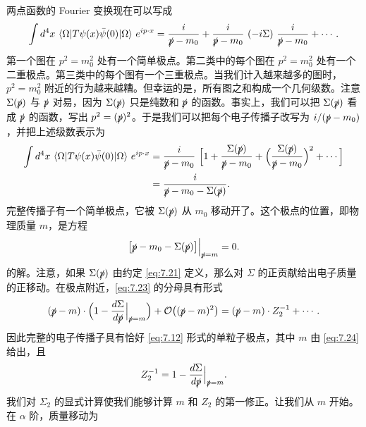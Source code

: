 两点函数的 Fourier 变换现在可以写成
\begin{equation}
  \int d^4x\ \langle\Omega|T\psi(x)\bar{\psi}(0)|\Omega\rangle\ e^{ip\cdot x}
  = \frac{i}{\slashed{p}-m_0}
    + \frac{i}{\slashed{p}-m_0}\ (-i\Sigma)\ \frac{i}{\slashed{p}-m_0}
    + \cdots .
  \label{eq:7.22}
\end{equation}
第一个图在 $p^2 = m_0^2$ 处有一个简单极点。第二类中的每个图在 $p^2 = m_0^2$ 处有一个二重极点。第三类中的每个图有一个三重极点。当我们计入越来越多的图时，$p^2 = m_0^2$ 附近的行为越来越糟。但幸运的是，所有图之和构成一个几何级数。注意 $\Sigma(\slashed{p})$ 与 $\slashed{p}$ 对易，因为 $\Sigma(\slashed{p})$ 只是纯数和 $\slashed{p}$ 的函数。事实上，我们可以把 $\Sigma(\slashed{p})$ 看成 $\slashed{p}$ 的函数，写出 $p^2 = (\slashed{p})^2$。于是我们可以把每个电子传播子改写为 $i/(\slashed{p}-m_0)$，并把上述级数表示为
\begin{equation}
  \begin{aligned}
    \int d^4x\ \langle\Omega|T\psi(x)\bar{\psi}(0)|\Omega\rangle\ e^{ip\cdot x}
    &= \frac{i}{\slashed{p}-m_0}\ \Bigl[ 1 +
      \frac{\Sigma(\slashed{p})}{\slashed{p}-m_0}
      + \Bigl( \frac{\Sigma(\slashed{p})}{\slashed{p}-m_0} \Bigr)^2
      + \cdots \Bigr]\\
    &= \frac{i}{\slashed{p}-m_0-\Sigma(\slashed{p})} .
  \end{aligned}
  \label{eq:7.23}
\end{equation}
完整传播子有一个简单极点，它被 $\Sigma(\slashed{p})$ 从 $m_0$ 移动开了。这个极点的位置，即物理质量 $m$，是方程
\begin{equation}
  \bigl[ \slashed{p} - m_0 - \Sigma(\slashed{p}) \bigr]
    \Big|_{\slashed{p}=m} = 0 .
  \label{eq:7.24}
\end{equation}
的解。注意，如果 $\Sigma(\slashed{p})$ 由约定 \eqref{eq:7.21} 定义，那么对 $\Sigma$ 的正贡献给出电子质量的正移动。在极点附近，\eqref{eq:7.23} 的分母具有形式
\begin{equation}
  (\slashed{p}-m)\cdot \Bigl( 1 - \frac{d\Sigma}{d\slashed{p}}
    \Big|_{\slashed{p}=m} \Bigr) + \mathcal{O}\bigl( (\slashed{p}-m)^2 \bigr)
  = (\slashed{p}-m)\cdot Z_2^{-1} + \cdots .
  \label{eq:7.25}
\end{equation}
因此完整的电子传播子具有恰好 \eqref{eq:7.12} 形式的单粒子极点，其中 $m$ 由 \eqref{eq:7.24} 给出，且
\begin{equation}
  Z_2^{-1} = 1 - \frac{d\Sigma}{d\slashed{p}}\Big|_{\slashed{p}=m} .
  \label{eq:7.26}
\end{equation}
我们对 $\Sigma_2$ 的显式计算使我们能够计算 $m$ 和 $Z_2$ 的第一修正。让我们从 $m$ 开始。在 $\alpha$ 阶，质量移动为
